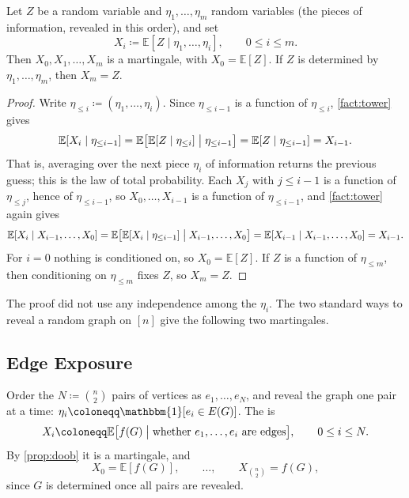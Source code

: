 \begin{proposition}\label{prop:doob}
    Let \(Z\) be a random variable and \(\eta_{1}, \ldots, \eta_{m}\) random variables (the pieces of information, revealed in this order), and set
    \[
        X_{i} \coloneqq \mathbb{E}[Z \mid \eta_{1}, \ldots, \eta_{i}], \qquad 0 \le i \le m .
    \]
    Then \(X_{0}, X_{1}, \ldots, X_{m}\) is a martingale, with \(X_{0} = \mathbb{E}[Z]\). If \(Z\) is determined by \(\eta_{1}, \ldots, \eta_{m}\), then \(X_{m} = Z\).
\end{proposition}

\begin{proof}
    Write \(\eta_{\le i} \coloneqq (\eta_{1}, \ldots, \eta_{i})\). Since \(\eta_{\le i-1}\) is a function of \(\eta_{\le i}\), \autoref{fact:tower} gives
    \[
        \mathbb{E}[X_{i} \mid \eta_{\le i-1}] = \mathbb{E}\bigl[ \mathbb{E}[Z \mid \eta_{\le i}] \bigm| \eta_{\le i-1} \bigr] = \mathbb{E}[Z \mid \eta_{\le i-1}] = X_{i-1} .
    \]
    That is, averaging over the next piece \(\eta_{i}\) of information returns the previous guess; this is the law of total probability. Each \(X_{j}\) with \(j \le i-1\) is a function of \(\eta_{\le j}\), hence of \(\eta_{\le i-1}\), so \(X_{0}, \ldots, X_{i-1}\) is a function of \(\eta_{\le i-1}\), and \autoref{fact:tower} again gives
    \[
        \mathbb{E}[X_{i} \mid X_{i-1}, \ldots, X_{0}]
        = \mathbb{E}\bigl[ \mathbb{E}[X_{i} \mid \eta_{\le i-1}] \bigm| X_{i-1}, \ldots, X_{0} \bigr]
        = \mathbb{E}[X_{i-1} \mid X_{i-1}, \ldots, X_{0}]
        = X_{i-1} .
    \]
    For \(i = 0\) nothing is conditioned on, so \(X_{0} = \mathbb{E}[Z]\). If \(Z\) is a function of \(\eta_{\le m}\), then conditioning on \(\eta_{\le m}\) fixes \(Z\), so \(X_{m} = Z\).
\end{proof}

The proof did not use any independence among the \(\eta_{i}\). The two standard ways to reveal a random graph on \([n]\) give the following two martingales.

\subsection{Edge Exposure}\label{sec:edge-exposure}

Order the \(N \coloneqq \binom{n}{2}\) pairs of vertices as \(e_{1}, \ldots, e_{N}\), and reveal the graph one pair at a time: \(\eta_{i} \coloneqq \mathbbm{1}[e_{i} \in E(G)]\). The  is
\[
    X_{i} \coloneqq \mathbb{E}\bigl[ f(G) \bigm| \text{whether } e_{1}, \ldots, e_{i} \text{ are edges} \bigr], \qquad 0 \le i \le N .
\]
By \autoref{prop:doob} it is a martingale, and
\[
    X_{0} = \mathbb{E}[f(G)], \qquad \ldots, \qquad X_{\binom{n}{2}} = f(G) ,
\]
since \(G\) is determined once all pairs are revealed.

